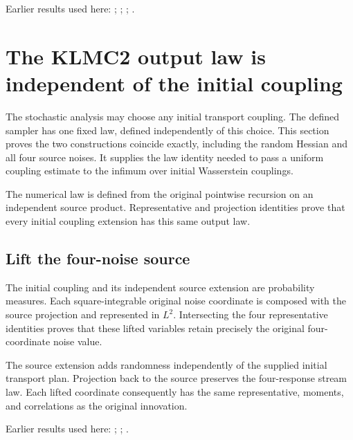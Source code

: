 \documentclass[11pt,a4paper]{report}
\begin{document}
Earlier results used here: \cite[Section~3.13.2]{LangevinLean2026ULASC}; \cite[Section~3.20.1]{LangevinLean2026ULASC}; \cite[Section~3.20.3]{LangevinLean2026ULASC}; \cite[Section~3.33.6]{LangevinLean2026ULASC}.
\section{\texorpdfstring{The KLMC2 output law is independent of the initial coupling}{The KLMC2 output law is independent of the initial coupling}}
\label{proof-module-KineticLangevin-KLMC2ProductLaw-lean}


The stochastic analysis may choose any initial transport coupling. The defined sampler has one fixed law, defined independently of this choice. This section proves the two constructions coincide exactly, including the random Hessian and all four source noises. It supplies the law identity needed to pass a uniform coupling estimate to the infimum over initial Wasserstein couplings.



The numerical law is defined from the original pointwise recursion on an independent source product. Representative and projection identities prove that every initial coupling extension has this same output law.

\subsection{\texorpdfstring{Lift the four-noise source}{Lift the four-noise source}}
\label{report-step-KineticLangevin-KLMC2ProductLaw-lean-1}


The initial coupling and its independent source extension are probability measures. Each square-integrable original noise coordinate is composed with the source projection and represented in \(L^{2}\). Intersecting the four representative identities proves that these lifted variables retain precisely the original four-coordinate noise value.



The source extension adds randomness independently of the supplied initial transport plan. Projection back to the source preserves the four-response stream law. Each lifted coordinate consequently has the same representative, moments, and correlations as the original innovation.



Earlier results used here: \cite[Section~3.17.1]{LangevinLean2026ULASC}; \cite[Section~3.22.2]{LangevinLean2026ULASC}; \cite[Section~3.22.3]{LangevinLean2026ULASC}.
\end{document}
